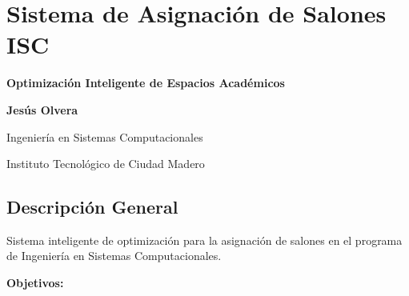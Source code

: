 \section{Sistema de Asignación de Salones ISC}

\textbf{Optimización Inteligente de Espacios Académicos}

\textbf{Jesús Olvera}

Ingeniería en Sistemas Computacionales

Instituto Tecnológico de Ciudad Madero


\subsection{Descripción General}

Sistema inteligente de optimización para la asignación de salones en el programa de Ingeniería en Sistemas Computacionales.

\textbf{Objetivos:}

